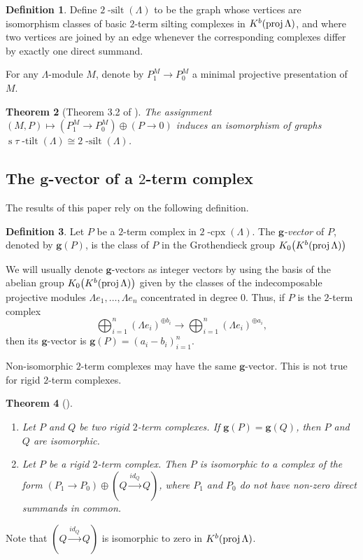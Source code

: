 \documentclass{amsart}
\newtheorem{theorem}{Theorem}%
\theoremstyle{definition}
\newtheorem{definition}[theorem]{Definition}
\renewcommand{\b}[1]{\mathbf{#1}} %
\newcommand{\darkblue}{\color{darkblue}} %
\newcommand{\defn}[1]{\textsl{\darkblue #1}} %
\newcommand{\stau}{\operatorname{s} \! \tau \! \operatorname{-tilt}}
\newcommand{\cpx}{2 \! \operatorname{-cpx}}
\newcommand{\silt}{2 \! \operatorname{-silt}}
\newcommand{\proj}{\operatorname{{\rm proj }}}
\begin{document}
\begin{definition}
 Define $\silt(\Lambda)$ to be the graph whose vertices are isomorphism classes of basic $2$-term silting complexes in $K^b(\proj \Lambda)$,
 and where two vertices are joined by an edge whenever the corresponding complexes differ by exactly one direct summand.
\end{definition}

For any $\Lambda$-module $M$, denote by $P_1^M\to P_0^M$ a minimal projective presentation of $M$.

\begin{theorem}[Theorem 3.2 of \cite{AIR}]
 The assignment $(M,P) \mapsto (P_1^M\to P_0^M) \oplus (P\to 0)$ induces an isomorphism of graphs $\stau(\Lambda) \cong \silt(\Lambda)$.
\end{theorem}


\subsection{The $\b{g}$-vector of a $2$-term complex}
The results of this paper rely on the following definition.

\begin{definition}
 Let $P$ be a $2$-term complex in $\cpx(\Lambda)$. 
 The \defn{$\b{g}$-vector} of $P$, denoted by $\b{g}(P)$, is the class of $P$ in the Grothendieck group $K_0\big(K^b(\proj \Lambda)\big)$
\end{definition}
We will usually denote $\b{g}$-vectors as integer vectors by using the basis of the abelian group $K_0\big(K^b(\proj \Lambda)\big)$
given by the classes of the indecomposable projective modules $\Lambda e_1, \ldots, \Lambda e_n$ concentrated in degree $0$.
Thus, if $P$ is the $2$-term complex
\[
 \bigoplus_{i=1}^n (\Lambda e_i)^{\oplus b_i} \xrightarrow{} \bigoplus_{i=1}^n (\Lambda e_i)^{\oplus a_i},
\]
then its $\b{g}$-vector is $\b{g}(P) = (a_i - b_i)_{i=1}^n$.

Non-isomorphic $2$-term complexes may have the same $\b{g}$-vector.  This is not true for rigid $2$-term complexes.

\begin{theorem}[\cite{}]
 \begin{enumerate}
  \item Let $P$ and $Q$ be two rigid $2$-term complexes.  If $\b{g}(P) = \b{g}(Q)$, then $P$ and $Q$ are isomorphic.
  
  \item Let $P$ be a rigid $2$-term complex.  Then $P$ is isomorphic to a complex of the form $(P_1\to P_0) \oplus (Q\stackrel{id_Q}{\to} Q)$,
    where $P_1$ and $P_0$ do not have non-zero direct summands in common.
 \end{enumerate}
\end{theorem}
Note that $(Q\stackrel{id_Q}{\to} Q)$ is isomorphic to zero in $K^b(\proj \Lambda)$.
\end{document}
